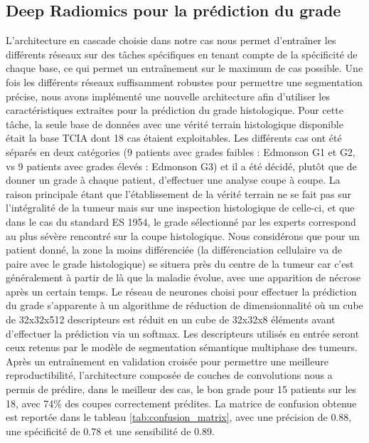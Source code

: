 \documentclass[]{memoir}
\begin{document}
\subsection{Deep Radiomics pour la prédiction du grade}
L’architecture en cascade choisie dans notre cas nous permet d’entraîner les différents réseaux sur des tâches spécifiques en tenant compte de la spécificité de chaque base, ce qui permet un entraînement sur le maximum de cas possible. 
Une fois les différents réseaux suffisamment robustes pour permettre une segmentation précise, nous avons implémenté une nouvelle architecture afin d’utiliser les caractéristiques extraites pour la prédiction du grade histologique.
Pour cette tâche, la seule base de données avec une vérité terrain histologique disponible était la base TCIA dont 18 cas étaient exploitables.
Les différents cas ont été séparés en deux catégories (9 patients avec grades faibles : Edmonson G1 et G2, vs 9 patients avec grades élevés : Edmonson G3) et il a été décidé, plutôt que de donner un grade à chaque patient, d’effectuer une analyse coupe à coupe. La raison principale étant que l’établissement de la vérité terrain ne se fait pas sur l’intégralité de la tumeur mais sur une inspection histologique de celle-ci, et que dans le cas du standard ES 1954, le grade sélectionné par les experts correspond au plus sévère rencontré sur la coupe histologique. Nous considérons que pour un patient donné, la zone la moins différenciée (la différenciation cellulaire va de paire avec le grade histologique) se situera près du centre de la tumeur car c’est généralement à partir de là que la maladie évolue, avec une apparition de nécrose après un certain temps. 
Le réseau de neurones choisi pour effectuer la prédiction du grade s’apparente à un algorithme de réduction de dimensionnalité où un cube de 32x32x512 descripteurs est réduit en un cube de 32x32x8 éléments avant d’effectuer la prédiction via un softmax. Les descripteurs utilisés en entrée seront ceux retenus par le modèle de segmentation sémantique multiphase des tumeurs. 
Après un entraînement en validation croisée pour permettre une meilleure reproductibilité, l’architecture composée de couches de convolutions nous a permis de prédire, dans le meilleur des cas, le bon grade pour 15 patients sur les 18, avec 74\% des coupes correctement prédites. La matrice de confusion obtenue est reportée dans le tableau \ref{tab:confusion_matrix}, avec une précision de 0.88, une spécificité de 0.78 et une sensibilité de 0.89. 
\end{document}
